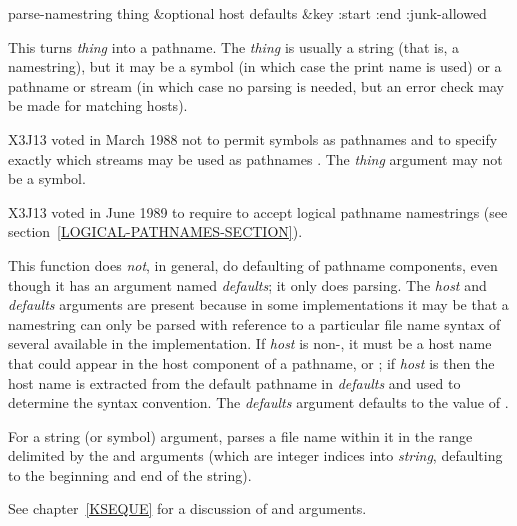 \begin{defun}[Function]
parse-namestring thing &optional host defaults &key :start :end :junk-allowed

\begin{obsolete}\noindent
This turns \emph{thing} into a pathname.  The \emph{thing} is usually a string
(that is, a namestring), but it may be a symbol (in which case the print
name is used) or a pathname or stream
(in which case no parsing is needed, but
an error check may be made for matching hosts).
\end{obsolete}

\begin{new}
X3J13 voted in March 1988
not to permit symbols as pathnames
 and
to specify exactly which streams may be used as pathnames
.  The \emph{thing} argument may not be a symbol.
\end{new}

\begin{newer}
X3J13 voted in June 1989  to require 
to accept logical pathname namestrings (see section~\ref{LOGICAL-PATHNAMES-SECTION}).
\end{newer}

This function does \emph{not}, in general, do defaulting of pathname components,
even though it has an argument named \emph{defaults};
it only does parsing.  The
\emph{host} and \emph{defaults} arguments are present because in some implementations
it may be that a namestring can only be parsed with reference to a
particular file name syntax of several available in the implementation.
If \emph{host} is
non-{\nil}, it must be a host name that could appear in the
host component of a pathname, or {\nil};
if \emph{host} is {\nil} then the host 
name is extracted from the default pathname in \emph{defaults}
and used to determine the syntax convention.  The \emph{defaults} argument
defaults to the value of .

For a string (or symbol) argument, 
parses a file name within it in the
range delimited by the  and  arguments
(which are integer indices
into \emph{string}, defaulting to the beginning and end of the string).

\begin{newer}
See chapter~\ref{KSEQUE} for a discussion of  and  arguments.
\end{newer}


\end{defun}
